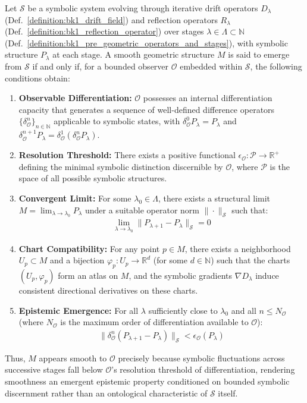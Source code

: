\begin{axiom}
\label{axiom:bk1_symbolic_smoothness}
Let $\mathcal{S}$ be a symbolic system evolving through iterative drift operators $D_\lambda$ (Def.~\ref{definition:bk1_drift_field}) and reflection operators $R_\lambda$ (Def.~\ref{definition:bk1_reflection_operator}) over stages $\lambda \in \Lambda \subset \mathbb{N}$ (Def.~\ref{definition:bk1_pre_geometric_operators_and_stages}), with symbolic structure $P_\lambda$ at each stage. A smooth geometric structure $M$ is said to emerge from $\mathcal{S}$ if and only if, for a bounded observer $\mathcal{O}$ embedded within $\mathcal{S}$, the following conditions obtain:
\begin{enumerate}
    \item \textbf{Observable Differentiation:} $\mathcal{O}$ possesses an internal differentiation capacity that generates a sequence of well-defined difference operators $\{\delta^n_{\mathcal{O}}\}_{n \in \mathbb{N}}$ applicable to symbolic states, with $\delta^0_{\mathcal{O}}P_\lambda = P_\lambda$ and $\delta^{n+1}_{\mathcal{O}}P_\lambda = \delta^1_{\mathcal{O}}(\delta^n_{\mathcal{O}}P_\lambda)$.
    \item \textbf{Resolution Threshold:} There exists a positive functional $\epsilon_{\mathcal{O}}: \mathcal{P} \rightarrow \mathbb{R}^+$ defining the minimal symbolic distinction discernible by $\mathcal{O}$, where $\mathcal{P}$ is the space of all possible symbolic structures.
    \item \textbf{Convergent Limit:} For some $\lambda_0 \in \Lambda$, there exists a structural limit $M = \lim_{\lambda \to \lambda_0} P_\lambda$ under a suitable operator norm $\|\cdot\|_{\mathcal{S}}$ such that:
        \begin{align}
        \lim_{\lambda \to \lambda_0} \|P_{\lambda+1} - P_\lambda\|_{\mathcal{S}} = 0
        \end{align}
    \item \textbf{Chart Compatibility:} For any point $p \in M$, there exists a neighborhood $U_p \subset M$ and a bijection $\varphi_p: U_p \rightarrow \mathbb{R}^d$ (for some $d \in \mathbb{N}$) such that the charts $(U_p, \varphi_p)$ form an atlas on $M$, and the symbolic gradients $\nabla D_\lambda$ induce consistent directional derivatives on these charts.
    \item \textbf{Epistemic Emergence:} For all $\lambda$ sufficiently close to $\lambda_0$ and all $n \leq N_{\mathcal{O}}$ (where $N_{\mathcal{O}}$ is the maximum order of differentiation available to $\mathcal{O}$):
        \begin{align}
        \|\delta^n_{\mathcal{O}}(P_{\lambda+1} - P_\lambda)\|_{\mathcal{S}} < \epsilon_{\mathcal{O}}(P_\lambda)
        \end{align}
\end{enumerate}
Thus, $M$ appears smooth to $\mathcal{O}$ precisely because symbolic fluctuations across successive stages fall below $\mathcal{O}$'s resolution threshold of differentiation, rendering smoothness an emergent epistemic property conditioned on bounded symbolic discernment rather than an ontological characteristic of $\mathcal{S}$ itself.
\end{axiom}
